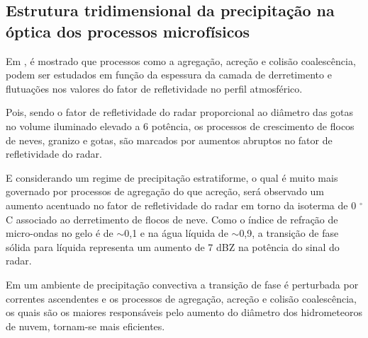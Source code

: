 



\subsection{Estrutura tridimensional da precipitação na óptica dos processos microfísicos}

\label{chuvaEtemperatura}


Em , é mostrado que processos como a agregação, acreção e colisão coalescência, podem ser estudados em função da espessura da camada de derretimento e flutuações nos valores do fator de refletividade no perfil atmosférico. 

Pois, sendo o fator de refletividade do radar proporcional ao diâmetro das gotas no volume iluminado elevado a 6 potência, os processos de crescimento de flocos de neves, granizo e gotas, são marcados por aumentos abruptos no fator de refletividade do radar. 

E considerando um regime de precipitação estratiforme, o qual é muito mais governado por processos de agregação do que acreção, será observado um aumento acentuado no fator de refletividade do radar em torno da isoterma de 0 $^{\circ}$C associado ao derretimento de flocos de neve.  Como o índice de refração de micro-ondas no gelo é de $\sim$0,1 e na água líquida de $\sim$0,9, a transição de fase sólida para líquida representa um aumento de 7 dBZ na potência do sinal do radar.



Em um ambiente de precipitação convectiva a transição de fase é perturbada por correntes ascendentes e os processos de agregação, acreção e colisão coalescência, os quais são os maiores responsáveis pelo aumento do diâmetro dos hidrometeoros de nuvem, tornam-se mais eficientes. 

